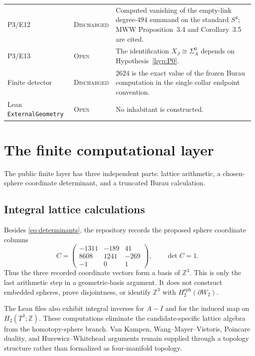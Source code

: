 \documentclass[11pt]{amsart}
\theoremstyle{definition}
\theoremstyle{remark}
\newcommand{\Z}{\mathbb{Z}}
\newcommand{\Open}{\textnormal{\textsc{Open}}}
\newcommand{\Discharged}{\textnormal{\textsc{Discharged}}}
\begin{document}
\begin{center}
\begin{tabularx}{\textwidth}{@{}l l X@{}}
P3/E12 & \Discharged & Computed vanishing of the empty-link degree-$494$ summand on the standard $S^4$; MWW Proposition~3.4 and Corollary~3.5 are cited. \\
P3/E13 & \Open & The identification $X_J\cong\Sigma_A^0$ depends on Hypothesis~\ref{hyp:P0}. \\
Finite detector & \Discharged & $2624$ is the exact value of the frozen Burau computation in the single collar endpoint convention. \\
Lean \texttt{ExternalGeometry} & \Open & No inhabitant is constructed. \\
\bottomrule
\end{tabularx}
\end{center}



\section{The finite computational layer}

The public finite layer has three independent parts: lattice arithmetic, a
chosen-sphere coordinate determinant, and a truncated Burau calculation.

\subsection{Integral lattice calculations}

Besides \eqref{eq:determinants}, the repository records the proposed sphere
coordinate columns
\begin{equation}\label{eq:spherecols}
C=\begin{pmatrix}
-1311&-189&41\\
8608&1241&-269\\
-1&0&1
\end{pmatrix},
\qquad \det C=1.
\end{equation}
Thus the three recorded coordinate vectors form a basis of $\Z^3$.  This is
only the last arithmetic step in a geometric-basis argument.  It does not
construct embedded spheres, prove disjointness, or identify $\Z^3$ with
$H_2^{\mathrm{sph}}(\partial W_2)$.

The Lean files also exhibit integral inverses for $A-I$ and for the induced
map on $H_2(T^3;\Z)$.  These computations eliminate the candidate-specific
lattice algebra from the homotopy-sphere branch.  Van Kampen,
Wang--Mayer--Vietoris, Poincare duality, and Hurewicz--Whitehead arguments
remain supplied through a topology structure rather than formalized as
four-manifold topology.
\end{document}
